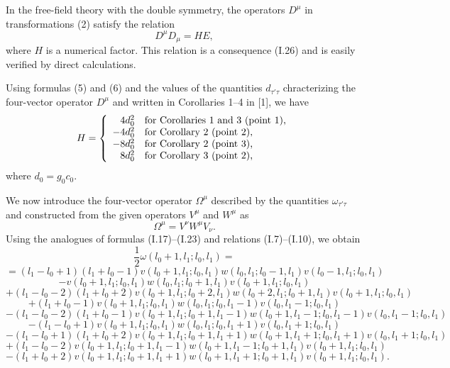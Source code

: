 \documentclass[a4paper,12pt]{article}
\begin{document}
In the free-field theory with the double symmetry, the operators $D^{\mu}$ in
transformations (2) satisfy the relation 
\begin{equation}
D^{\mu}D_{\mu} =HE,
\end{equation}
where $H$ is a numerical factor. This relation is a consequence (I.26) and is
easily verified by direct calculations.

Using formulas (5) and (6) and the values of the quantities $d_{\tau'\tau}$
chracterizing the four-vector operator $D^{\mu}$ and written in Corollaries
1--4 in [1], we have
\begin{equation}
H = \left\{
\begin{array}{rl}
4d^{2}_{0} & {\mbox{\rm for Corollaries 1 and 3 (point 1),}} \\
-4d^{2}_{0} & {\mbox{\rm for Corollary 2 (point 2),}} \\
-8d^{2}_{0} & {\mbox{\rm for Corollary 2 (point 3),}} \\
8d^{2}_{0} & {\mbox{\rm for Corollary 3 (point 2),}}
\end{array} \right.
\end{equation}
where $d_{0}=g_{0}c_{0}$.

We now introduce the four-vector operator $\Omega^{\mu}$ described by the
quantities $\omega_{\tau' \tau}$ and constructed from the given operators
$V^{\mu}$ and $W^{\mu}$ as
$$\Omega^{\mu} = V^{\nu}W^{\mu}V_{\nu}.$$
Using the analogues of formulas (I.17)--(I.23) and relations (I.7)--(I.10), we
obtain
$$\frac{1}{2} \omega (l_{0}+1,l_{1};l_{0},l_{1}) =$$
$$= (l_{1}-l_{0}+1)(l_{1}+l_{0}-1) v(l_{0}+1,l_{1};l_{0},l_{1})
w(l_{0},l_{1};l_{0}-1,l_{1}) v(l_{0}-1,l_{1};l_{0},l_{1})$$
$$- v(l_{0}+1,l_{1};l_{0},l_{1}) w(l_{0},l_{1};l_{0}+1,l_{1})
v(l_{0}+1,l_{1};l_{0},l_{1})$$
$$+ (l_{1}-l_{0}-2)(l_{1}+l_{0}+2) v(l_{0}+1,l_{1};l_{0}+2,l_{1})
w(l_{0}+2,l_{1};l_{0}+1,l_{1}) v(l_{0}+1,l_{1};l_{0},l_{1})$$
$$+ (l_{1}+l_{0}-1) v(l_{0}+1,l_{1};l_{0},l_{1})
w(l_{0},l_{1};l_{0},l_{1}-1) v(l_{0},l_{1}-1;l_{0},l_{1})$$
$$- (l_{1}-l_{0}-2)(l_{1}+l_{0}-1) v(l_{0}+1,l_{1};l_{0}+1,l_{1}-1)
w(l_{0}+1,l_{1}-1;l_{0},l_{1}-1) v(l_{0},l_{1}-1;l_{0},l_{1})$$
$$- (l_{1}-l_{0}+1) v(l_{0}+1,l_{1};l_{0},l_{1})
w(l_{0},l_{1};l_{0},l_{1}+1) v(l_{0},l_{1}+1;l_{0},l_{1})$$
$$- (l_{1}-l_{0}+1)(l_{1}+l_{0}+2) v(l_{0}+1,l_{1};l_{0}+1,l_{1}+1)
w(l_{0}+1,l_{1}+1;l_{0},l_{1}+1) v(l_{0},l_{1}+1;l_{0},l_{1})$$
$$+ (l_{1}-l_{0}-2) v(l_{0}+1,l_{1};l_{0}+1,l_{1}-1)
w(l_{0}+1,l_{1}-1;l_{0}+1,l_{1}) v(l_{0}+1,l_{1};l_{0},l_{1})$$
\begin{equation}
- (l_{1}+l_{0}+2) v(l_{0}+1,l_{1};l_{0}+1,l_{1}+1)
w(l_{0}+1,l_{1}+1;l_{0}+1,l_{1}) v(l_{0}+1,l_{1};l_{0},l_{1}).
\end{equation}
\end{document}

